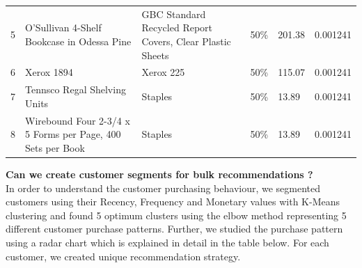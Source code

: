 \documentclass[11pt]{article} %
\begin{document}
\begin{table}[H]
\begin{tabular}{@{}lp{4cm}p{4cm}lll@{}}
5                                                                                       & O'Sullivan 4-Shelf Bookcase in Odessa Pine                                            & GBC Standard Recycled Report Covers, Clear Plastic Sheets                                  & 50\%                                    & 201.38                            & 0.001241                             \\
6                                                                                       & Xerox 1894                                                                            & Xerox 225                                                                                  & 50\%                                    & 115.07                            & 0.001241                             \\
7                                                                                       & Tennsco Regal Shelving Units                                                          & Staples                                                                                    & 50\%                                    & 13.89                             & 0.001241                             \\
8                                                                                       & Wirebound Four 2-3/4 x 5 Forms per Page, 400 Sets per Book                            & Staples                                                                                    & 50\%                                    & 13.89                             & 0.001241                             \\ \bottomrule
\end{tabular}
\end{table}
\clearpage
\textbf{Can we create customer segments for bulk recommendations ?}\\
In order to understand the customer purchasing behaviour, we segmented customers using their Recency, Frequency and Monetary values with K-Means clustering and found 5 optimum clusters using the elbow method representing 5 different customer purchase patterns. Further, we studied the purchase pattern using a radar chart which is explained in detail in the table below. For each customer, we created unique recommendation strategy.
\end{document}
